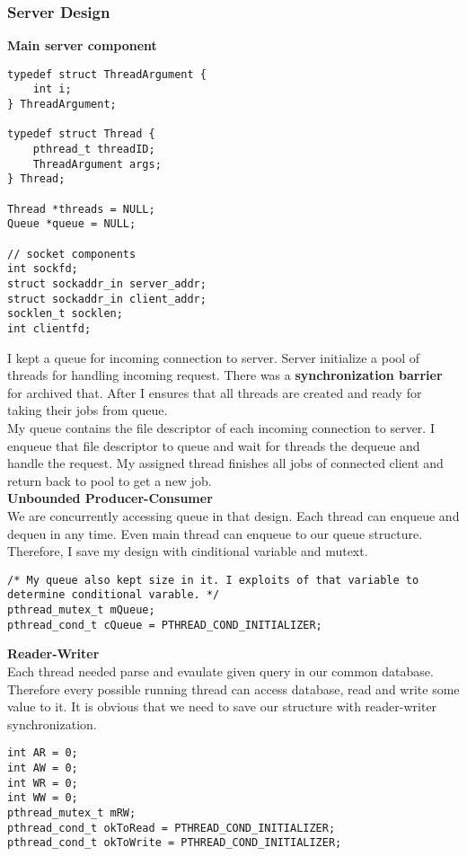 \documentclass{article}
\begin{document}
\subsubsection{Server Design}
\textbf{Main server component}
\begin{lstlisting}[style=CStyle]
typedef struct ThreadArgument {
    int i;
} ThreadArgument;

typedef struct Thread {
    pthread_t threadID;
    ThreadArgument args;
} Thread;

Thread *threads = NULL;
Queue *queue = NULL;

// socket components
int sockfd;
struct sockaddr_in server_addr;
struct sockaddr_in client_addr;
socklen_t socklen;
int clientfd;
\end{lstlisting}
I kept a queue for incoming connection to server. Server initialize a pool of threads for handling incoming request. There was a \textbf{synchronization barrier} for archived that. After I ensures that all threads are created and ready for taking their jobs from queue.\\
My queue contains the file descriptor of each incoming connection to server. I enqueue that file descriptor to queue and wait for threads the dequeue and handle the request. My assigned thread finishes all jobs of connected client and return back to pool to get a new job.\\
\textbf{Unbounded Producer-Consumer}\\
We are concurrently accessing queue in that design. Each thread can enqueue and dequeu in any time. Even main thread can enqueue to our queue structure. Therefore, I save my design with cinditional variable and mutext.
\begin{lstlisting}[style=CStyle]
/* My queue also kept size in it. I exploits of that variable to determine conditional varable. */
pthread_mutex_t mQueue;
pthread_cond_t cQueue = PTHREAD_COND_INITIALIZER;
\end{lstlisting}
\textbf{Reader-Writer}\\
Each thread needed parse and evaulate given query in our common database. Therefore every possible running thread can access database, read and write some value to it. It is obvious that we need to save our structure with reader-writer synchronization.
\begin{lstlisting}[style=CStyle]
int AR = 0;
int AW = 0;
int WR = 0;
int WW = 0;
pthread_mutex_t mRW;
pthread_cond_t okToRead = PTHREAD_COND_INITIALIZER;
pthread_cond_t okToWrite = PTHREAD_COND_INITIALIZER;
\end{lstlisting}
\end{document}
